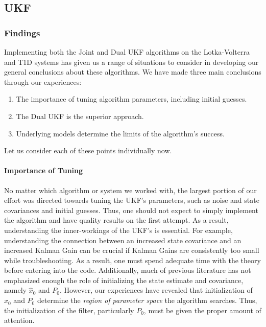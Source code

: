 \documentclass{article}
\begin{document}
\subsection{UKF}
\subsubsection{Findings}
Implementing both the Joint and Dual UKF algorithms on the Lotka-Volterra and T1D systems has given us a range of situations to consider in developing our general conclusions about these algorithms. We have made three main conclusions through our experiences:
\begin{enumerate}
    \item The importance of tuning algorithm parameters, including initial guesses.
    \item The Dual UKF is the superior approach.
    \item Underlying models determine the limits of the algorithm's success.
\end{enumerate}
Let us consider each of these points individually now.

\paragraph{Importance of Tuning}
No matter which algorithm or system we worked with, the largest portion of our effort was directed towards tuning the UKF's parameters, such as noise and state covariances and initial guesses. Thus, one should not expect to simply implement the algorithm and have quality results on the first attempt. As a result, understanding the inner-workings of the UKF's is essential. For example, understanding the connection between an increased state covariance and an increased Kalman Gain can be crucial if Kalman Gains are consistently too small while troubleshooting. As a result, one must spend adequate time with the theory before entering into the code. Additionally, much of previous literature has not emphasized enough the role of initializing the state estimate and covariance, namely $\hat{x}_0$ and $P_0$. However, our experiences have revealed that initialization of $\hat{x}_0$ and $P_0$ determine the \emph{region of parameter space} the algorithm searches. Thus, the initialization of the filter, particularly $P_0$, must be given the proper amount of attention.
\end{document}
